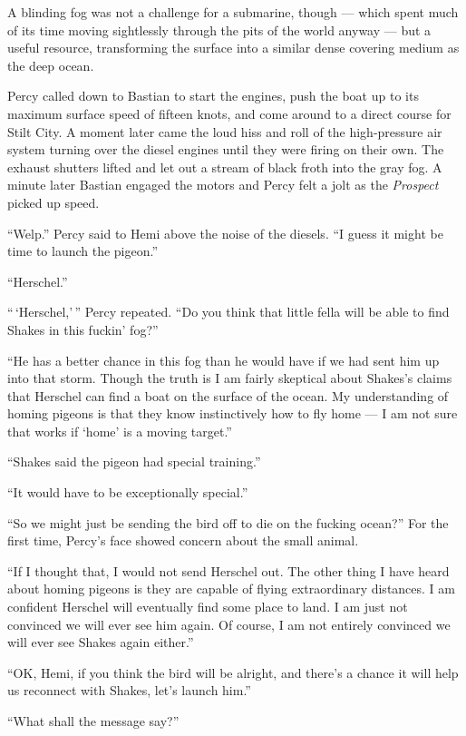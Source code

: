 \documentclass[
]{scrbook}
\begin{document}
A blinding fog was not a challenge for a submarine, though --- which
spent much of its time moving sightlessly through the pits of the world
anyway --- but a useful resource, transforming the surface into a
similar dense covering medium as the deep ocean.

Percy called down to Bastian to start the engines, push the boat up to
its maximum surface speed of fifteen knots, and come around to a direct
course for Stilt City. A moment later came the loud hiss and roll of the
high-pressure air system turning over the diesel engines until they were
firing on their own. The exhaust shutters lifted and let out a stream of
black froth into the gray fog. A minute later Bastian engaged the motors
and Percy felt a jolt as the \emph{Prospect} picked up speed.

``Welp.'' Percy said to Hemi above the noise of the diesels. ``I guess
it might be time to launch the pigeon.''

``Herschel.''

``\,`Herschel,'\,'' Percy repeated. ``Do you think that little fella
will be able to find Shakes in this fuckin' fog?''

``He has a better chance in this fog than he would have if we had sent
him up into that storm. Though the truth is I am fairly skeptical about
Shakes's claims that Herschel can find a boat on the surface of the
ocean. My understanding of homing pigeons is that they know
instinctively how to fly home --- I am not sure that works if `home' is
a moving target.''

``Shakes said the pigeon had special training.''

``It would have to be exceptionally special.''

``So we might just be sending the bird off to die on the fucking
ocean?'' For the first time, Percy's face showed concern about the small
animal.

``If I thought that, I would not send Herschel out. The other thing I
have heard about homing pigeons is they are capable of flying
extraordinary distances. I am confident Herschel will eventually find
some place to land. I am just not convinced we will ever see him again.
Of course, I am not entirely convinced we will ever see Shakes again
either.''

``OK, Hemi, if you think the bird will be alright, and there's a chance
it will help us reconnect with Shakes, let's launch him.''

``What shall the message say?''
\end{document}
